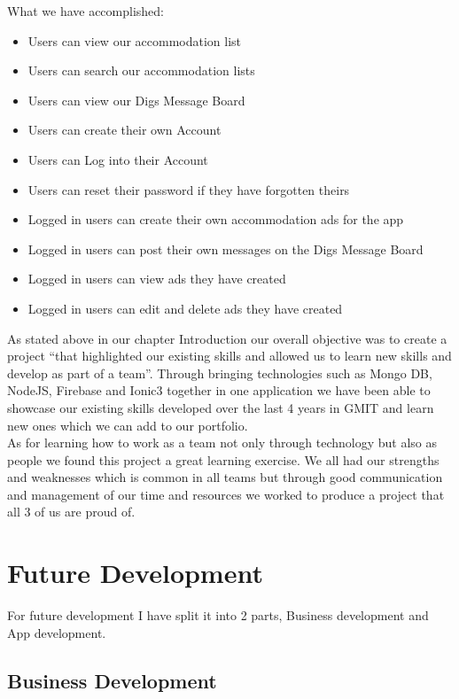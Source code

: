 \noindent What we have accomplished:
\begin{itemize}
    \item Users can view our accommodation list
    \item Users can search our accommodation lists
    \item Users can view our Digs Message Board
    \item Users can create their own Account
    \item Users can Log into their Account
    \item Users can reset their password if they have forgotten theirs
    \item Logged in users can create their own accommodation ads for the app
    \item Logged in users can post their own messages on the Digs Message Board
    \item Logged in users can view ads they have created 
    \item Logged in users can edit and delete ads they have created
\end{itemize}

As stated above in our chapter Introduction our overall objective was to create a project “that highlighted our existing skills and allowed us to learn new skills and develop as part of a team”. Through bringing technologies such as Mongo DB, NodeJS, Firebase and Ionic3 together in one application we have been able to showcase our existing skills developed over the last 4 years in GMIT and learn new ones which we can add to our portfolio.\\

\noindent As for learning how to work as a team not only through technology but also as people we found this project a great learning exercise. We all had our strengths and weaknesses which is common in all teams but through good communication and management of our time and resources we worked to produce a project that all 3 of us are proud of.

\section{Future Development}

For future development I have split it into 2 parts, Business development and  App development.

\subsection{Business Development}

